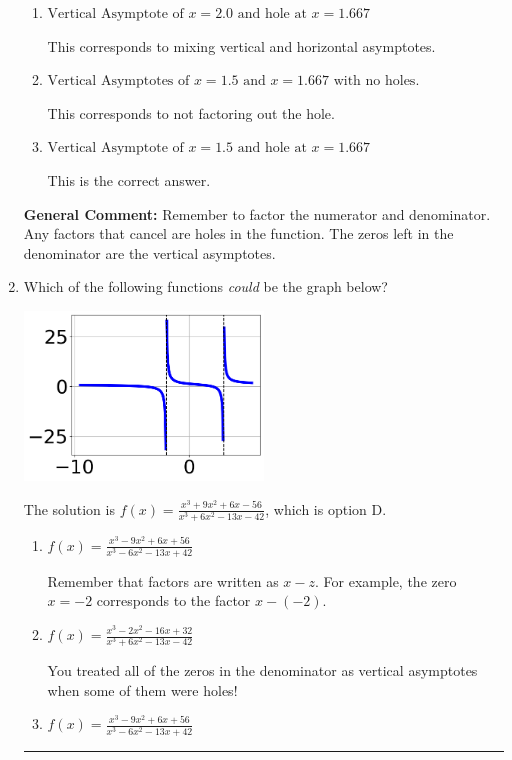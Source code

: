 \documentclass{extbook}[14pt]
\newcommand{\litem}[1]{\item #1

\rule{\textwidth}{0.4pt}}
\begin{document}
\begin{enumerate}
{\begin{enumerate}[label=\Alph*.]
This corresponds to setting the numerator equal to 0.
\item \( \text{Vertical Asymptote of } x = 2.0 \text{ and hole at } x = 1.667 \)

This corresponds to mixing vertical and horizontal asymptotes.
\item \( \text{Vertical Asymptotes of } x = 1.5 \text{ and } x = 1.667 \text{ with no holes.} \)

This corresponds to not factoring out the hole.
\item \( \text{Vertical Asymptote of } x = 1.5 \text{ and hole at } x = 1.667 \)

This is the correct answer.
\end{enumerate}

\textbf{General Comment:} Remember to factor the numerator and denominator. Any factors that cancel are holes in the function. The zeros left in the denominator are the vertical asymptotes.
}
\litem{
Which of the following functions \textit{could} be the graph below?

\begin{center}
    \includegraphics[width=0.5\textwidth]{../Figures/identifyGraphOfRationalFunctionC.png}
\end{center}


The solution is \( f(x)=\frac{x^{3} +9 x^{2} +6 x -56}{x^{3} +6 x^{2} -13 x -42} \), which is option D.\begin{enumerate}[label=\Alph*.]
\item \( f(x)=\frac{x^{3} -9 x^{2} +6 x + 56}{x^{3} -6 x^{2} -13 x + 42} \)

Remember that factors are written as $x-z$. For example, the zero $x=-2$ corresponds to the factor $x-(-2)$.
\item \( f(x)=\frac{x^{3} -2 x^{2} -16 x + 32}{x^{3} +6 x^{2} -13 x -42} \)

You treated all of the zeros in the denominator as vertical asymptotes when some of them were holes!
\item \( f(x)=\frac{x^{3} -9 x^{2} +6 x + 56}{x^{3} -6 x^{2} -13 x + 42} \)


\end{enumerate}}
\end{enumerate}
\end{document}
